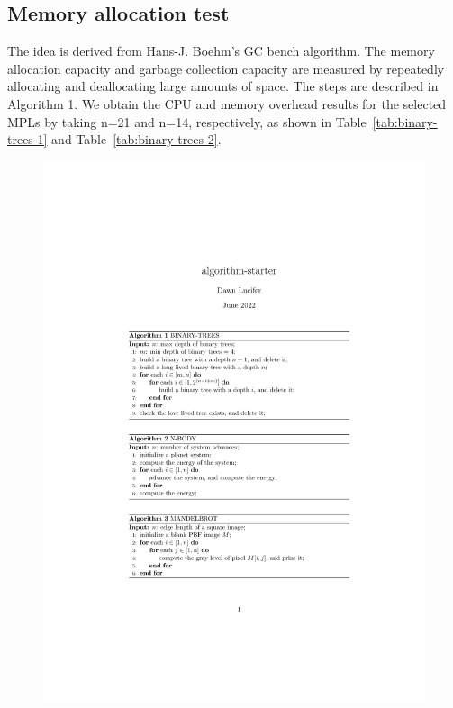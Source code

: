 \subsection{Memory allocation test}
The idea is derived from Hans-J. Boehm's GC bench algorithm.
The memory allocation capacity and garbage collection capacity are measured by repeatedly allocating and deallocating large amounts of space.
The steps are described in Algorithm 1.
We obtain the CPU and memory overhead results for the selected MPLs
by taking n=21 and n=14, respectively, as shown in Table~\ref{tab:binary-trees-1} and Table~\ref{tab:binary-trees-2}.

\begin{figure}[htbp]
    \centerline{\includegraphics[scale=0.8]{figures/binary-trees}}
    \label{fig:binary-trees}
\end{figure}

